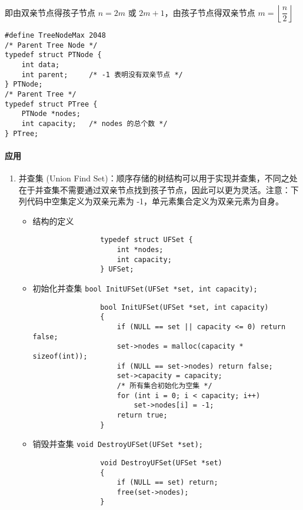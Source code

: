 \documentclass{ctexart}
\begin{document}
即由双亲节点得孩子节点 $n = 2m$ 或 $2m + 1$，由孩子节点得双亲节点 $m = \left\lfloor \dfrac{n}{2} \right\rfloor$

\begin{verbatim}
#define TreeNodeMax 2048
/* Parent Tree Node */
typedef struct PTNode {
    int data;
    int parent;     /* -1 表明没有双亲节点 */
} PTNode;
/* Parent Tree */
typedef struct PTree {
    PTNode *nodes;
    int capacity;   /* nodes 的总个数 */
} PTree;
\end{verbatim}

\paragraph{应用}
\begin{enumerate}
    \item 并查集 (Union Find Set)：顺序存储的树结构可以用于实现并查集，不同之处在于并查集不需要通过双亲节点找到孩子节点，因此可以更为灵活。注意：下列代码中空集定义为双亲元素为 -1，单元素集合定义为双亲元素为自身。
        \begin{itemize}
            \item 结构的定义
                \begin{verbatim}
                typedef struct UFSet {
                    int *nodes;
                    int capacity;
                } UFSet;
                \end{verbatim}

            \item 初始化并查集 \texttt{bool InitUFSet(UFSet *set, int capacity);}
                \begin{verbatim}
                bool InitUFSet(UFSet *set, int capacity)
                {
                    if (NULL == set || capacity <= 0) return false;
                    set->nodes = malloc(capacity * sizeof(int));
                    if (NULL == set->nodes) return false;
                    set->capacity = capacity;
                    /* 所有集合初始化为空集 */
                    for (int i = 0; i < capacity; i++)
                        set->nodes[i] = -1;
                    return true;
                }
                \end{verbatim}

            \item 销毁并查集 \texttt{void DestroyUFSet(UFSet *set);}
                \begin{verbatim}
                void DestroyUFSet(UFSet *set)
                {
                    if (NULL == set) return;
                    free(set->nodes);
                }
                \end{verbatim}


\end{itemize}
\end{enumerate}
\end{document}
